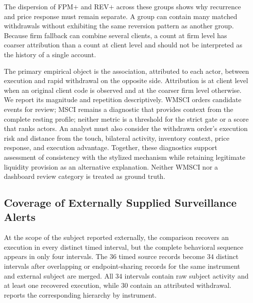 \documentclass[11pt]{article}
\newenvironment{review}{\begingroup\color{blue}}{\endgroup}
\begin{document}
The dispersion of FPM$+$ and REV$+$ across these groups shows why recurrence and price response must remain separate. A group
can contain many matched withdrawals without exhibiting the same reversion pattern as another group. Because firm fallback
can combine several clients, \begin{review}a count at firm level has coarser attribution than a count at client level and should not be interpreted as the history of a single account\end{review}.

\begin{review}The primary empirical object is the association, attributed to each actor, between execution and rapid withdrawal on the opposite side. Attribution is at client level when an original client code is observed and at the coarser firm level otherwise.\end{review} We report
its magnitude and repetition descriptively. \begin{review}WMSCI orders candidate events for review; MSCI remains a diagnostic that provides context from the complete resting profile; neither metric is a threshold for the strict gate or a score that ranks actors.\end{review} An analyst must also
consider the withdrawn order's execution risk and distance from the touch, bilateral activity, inventory context, price
response, and execution advantage. Together, these diagnostics support assessment of consistency with the stylized mechanism
while retaining legitimate liquidity provision as an alternative explanation. Neither WMSCI nor a dashboard review category
is treated as ground truth.

\subsection{Coverage of Externally Supplied Surveillance Alerts}
\label{subsec:external_alert_results}

\begin{review}At the scope of the subject reported externally\end{review}, the comparison recovers an execution in every distinct timed interval,
but the complete behavioral sequence appears in only four intervals. The $36$ timed source records become $34$ distinct intervals
after overlapping or endpoint-sharing records for the same instrument and external subject are merged. All $34$ intervals
contain raw subject activity and at least one recovered execution, while $30$ contain an attributed withdrawal.
 reports the corresponding hierarchy by instrument.
\end{document}
